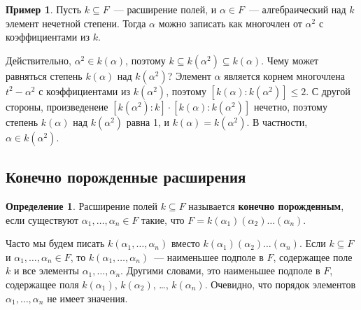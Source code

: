 \documentclass[a4paper,11pt]{scrartcl}
\theoremstyle{plain}
\theoremstyle{definition}
\newtheorem{definition}[theorem]{Определение}
\newtheorem{example}[theorem]{Пример}
\newcommand\dfn[1]{\textbf{#1}}
\newcommand\sseq{\subseteq}
\begin{document}
\begin{example}
Пусть $k\sseq F$~--- расширение полей, и $\alpha\in F$~---
алгебраический над $k$ элемент нечетной степени. Тогда $\alpha$ можно
записать как многочлен от $\alpha^2$ с коэффициентами из $k$.

Действительно, $\alpha^2\in k(\alpha)$, поэтому $k\sseq k
(\alpha^2)\sseq
k(\alpha)$. Чему может равняться степень $k(\alpha)$ над $k
(\alpha^2)$? Элемент
$\alpha$ является корнем многочлена $t^2-\alpha^2$ с коэффициентами из
$k(\alpha^2)$, поэтому $[k(\alpha):k(\alpha^2)]\leq 2$. С другой
стороны,
произведенеие $[k(\alpha^2):k]\cdot [k(\alpha):k(\alpha^2)]$ нечетно,
поэтому
степень $k(\alpha)$ над $k(\alpha^2)$ равна 1, и $k(\alpha)=k
(\alpha^2)$. В частности, $\alpha\in k(\alpha^2)$.
\end{example}

\subsection{Конечно порожденные расширения}

\begin{definition}
Расширение полей $k\subseteq F$ называется \dfn{конечно порожденным},
если существуют $\alpha_1,\dots,\alpha_n\in F$ такие, что
$F=k(\alpha_1)(\alpha_2)\dots(\alpha_n)$.
\end{definition}
Часто мы будем писать
$k(\alpha_1,\dots,\alpha_n)$ вместо $k(\alpha_1)(\alpha_2)\dots
(\alpha_n)$. Если
$k\subseteq F$ и $\alpha_1,\dots,\alpha_n\in F$, то $k
(\alpha_1,\dots,\alpha_n)$~---
наименьшее подполе в $F$, содержащее поле $k$ и все элементы
$\alpha_1,\dots,\alpha_n$. Другими словами, это наименьшее подполе в
$F$,
содержащее поля $k(\alpha_1)$, $k(\alpha_2)$, \dots, $k(\alpha_n)$.
Очевидно, что порядок элементов $\alpha_1,\dots,\alpha_n$ не имеет
значения.
\end{document}
